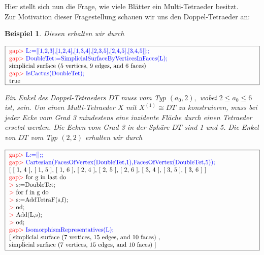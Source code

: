 \documentclass[12pt,titlepage,twoside,cleardoublepage]{article}
\theoremstyle{nummermitklammern}
\newtheorem{bsp}[temp]{Beispiel}
\newtheorem{bsp}[zahl]{Beispiel}
\numberwithin{equation}{section}
\begin{document}
Hier stellt sich nun die Frage, wie viele Blätter ein Multi-Tetraeder besitzt. \\
Zur Motivation dieser Fragestellung schauen wir uns den Doppel-Tetraeder an:
\begin{bsp}
Diesen erhalten wir durch
\begin{center}
 $\fbox{
\parbox{14cm}{
\textcolor{red}{gap$>$} \textcolor{blue}{L:=[[1,2,3],[1,2,4],[1,3,4],[2,3,5],[2,4,5],[3,4,5]];;}\newline
\textcolor{red}{gap$>$} \textcolor{blue}{DoubleTet:=SimplicialSurfaceByVerticesInFaces(L);}\newline
simplicial surface (5 vertices, 9 edges, and 6 faces)\newline
\textcolor{red}{gap$>$} \textcolor{blue}{IsCactus(DoubleTet);}\newline
true
}}$
\end{center}
Ein Enkel des Doppel-Tetraeders $DT$ muss vom Typ $(a_0,2),$ wobei $2\leq a_0 \leq 6$ ist, sein.
Um einen Multi-Tetraeder $X$ mit $X^{(1)}\cong DT$ zu konstruieren, muss bei jeder Ecke vom Grad 3 mindestens eine inzidente Fläche durch einen Tetraeder ersetzt werden. Die Ecken vom Grad 3 in der Sphäre $DT$ sind 1 und 5. 
Die Enkel von $DT$ vom Typ $(2,2)$ erhalten wir durch
\end{bsp}
\begin{center}
 $\fbox{
\parbox{14cm}{
\textcolor{red}{gap$>$} \textcolor{blue}{L:=[];;}\newline
\textcolor{red}{gap$>$} \textcolor{blue}{Cartesian(FacesOfVertex(DoubleTet,1),FacesOfVertex(DoubleTet,5));}\newline
[ [ 1, 4 ], [ 1, 5 ], [ 1, 6 ], [ 2, 4 ], [ 2, 5 ], [ 2, 6 ], [ 3, 4 ],
  [ 3, 5 ], [ 3, 6 ] ]\newline
\textcolor{red}{gap$>$} for g in last do\newline
\textcolor{red}{$>$} s:=DoubleTet;\newline
\textcolor{red}{$>$} for f in g do\newline
\textcolor{red}{$>$} s:=AddTetraF(s,f);\newline
\textcolor{red}{$>$} od;\newline
\textcolor{red}{$>$} Add(L,s);\newline
\textcolor{red}{$>$} od;\newline
\textcolor{red}{gap$>$} \textcolor{blue}{IsomorphismRepresentatives(L);}\newline
[ simplicial surface (7 vertices, 15 edges, and 10 faces)
    ,\newline
  simplicial surface (7 vertices, 15 edges, and 10 faces)
 ]
 }}$
 \end{center}
\end{document}

